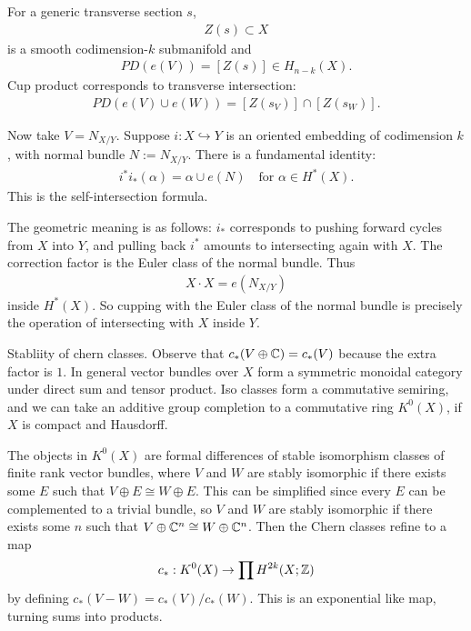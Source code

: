 \documentclass[12pt]{article}
\begin{document}
\begin{remark}
    For a generic transverse section $s$,
    \begin{align*}
        Z(s) \subset X
    \end{align*}
    is a smooth codimension-$k$ submanifold and
    \begin{align*}
        PD(e(V)) = [Z(s)] \in H_{n-k}(X).
    \end{align*}
    Cup product corresponds to transverse intersection:
    \begin{align*}
        PD(e(V) \cup e(W)) = [Z(s_V)] \cap [Z(s_W)].
    \end{align*}

    Now take $V = N_{X/Y}$. Suppose $i : X \hookrightarrow Y$ is an oriented embedding of codimension $k$, with normal bundle $N := N_{X/Y}$. There is a fundamental identity:
    \begin{align*}
        i^* i_*(\alpha) = \alpha \cup e(N) \quad \text{for } \alpha \in H^*(X).
    \end{align*}
    This is the self-intersection formula.

    The geometric meaning is as follows: $i_*$ corresponds to pushing forward cycles from $X$ into $Y$, and pulling back $i^*$ amounts to intersecting again with $X$. The correction factor is the Euler class of the normal bundle. Thus
    \begin{align*}
        X \cdot X = e(N_{X/Y})
    \end{align*}
    inside $H^*(X)$. So cupping with the Euler class of the normal bundle is precisely the operation of intersecting with $X$ inside $Y$.
\end{remark}


Stabliity of chern classes. Observe that $c_*(V\oplus \mathbb{C}) = c_*(V)$ because the extra factor is $1$. In general vector bundles over $X$ form a symmetric monoidal category under direct sum and tensor product. Iso classes form a commutative semiring, and we can take an additive group completion to a commutative ring $K^0(X)$, if $X$ is compact and Hausdorff. 

The objects in $K^0(X)$ are formal differences of stable isomorphism classes of finite rank vector bundles, where $V$ and $W$ are stably isomorphic if there exists some $E$ such that $V\oplus E \cong W \oplus E$. This can be simplified since every $E$ can be complemented to a trivial bundle, so $V$ and $W$ are stably isomorphic if there exists some $n$ such that $V\oplus \mathbb{C}^n \cong W \oplus \mathbb{C}^n$. Then the Chern classes refine to a map \begin{align*}
    c_*: K^0(X) \to \prod H^{2k}(X; \mathbb{Z})
\end{align*}
by defining $c_*(V-W) = c_*(V)/c_*(W)$.
This is an exponential like map, turning sums into products.
\end{document}
